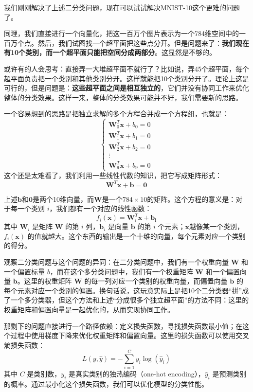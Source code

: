 我们刚刚解决了上述二分类问题，现在可以试试解决MNIST-10这个更难的问题了。

同理，我们直接进行一个向量化，把这一百万个图片表示为一个784维空间中的一百万个点。然后，我们试图找一个超平面把这些点分开。但是问题来了：\textbf{我们现在有10个类别，而一个超平面只能把空间分成两部分}。这显然是不够的。

或许有的人会思考：直接弄一大堆超平面不就行了？比如说，弄45个超平面，每个超平面负责把一个类别和其他类别分开。这样就能把10个类别分开了。理论上这是可行的，但是问题是：\textbf{这些超平面之间是相互独立的}，它们并没有协同工作来优化整体的分类效果。这样一来，整体的分类效果可能并不好，我们需要新的思路。

一个容易想到的思路是把独立求解的多个方程合并成一个方程组，也就是：
\[
    \begin{cases}
        \mathbf{W}_0^T \mathbf{x} + b_0 = 0 \\
        \mathbf{W}_1^T \mathbf{x} + b_1 = 0 \\
        \mathbf{W}_2^T \mathbf{x} + b_2 = 0 \\
        \vdots \\
        \mathbf{W}_9^T \mathbf{x} + b_9 = 0
\end{cases}\]
这个还是太难看了，我们利用一些线性代数的知识，把它写成矩阵形式：
\[ \mathbf{W}^T \mathbf{x} + \mathbf{b} = \mathbf{0} \]

上述$\mathbf{b}$和$\mathbf{0}$是两个10维向量，而$\mathbf{W}$是一个$784 \times 10$的矩阵。这个方程的意义是：对于每一个类别 $i$，我们都有一个对应的线性函数：
\[ f_i(\mathbf{x}) = \mathbf{W}_i^T \mathbf{x + b_i} \]
其中 $\mathbf{W}_i$ 是矩阵 $\mathbf{W}$ 的第 $i$ 列，$\mathbf{b}_i$ 是向量 $\mathbf{b}$ 的第 $i$ 个元素；$\mathbf{x}$越像某一个类别，$f_i(\mathbf{x})$ 的值就越大。这个东西的输出是一个十维的向量，每个元素对应一个类别的得分。

观察二分类问题与这个问题的异同：在二分类问题中，我们有一个权重向量 $\mathbf{W}$ 和一个偏置标量 $b$，而在这个多分类问题中，我们有一个权重矩阵 $\mathbf{W}$ 和一个偏置向量 $\mathbf{b}$。这里的权重矩阵 $\mathbf{W}$ 的每一列对应一个类别的权重向量，而偏置向量 $\mathbf{b}$ 的每个元素对应一个类别的偏置。换句话说，这玩意实际上是把10个二分类器“拼”成了一个多分类器，但这个方法和上述“分成很多个独立超平面”的方法不同：这里的权重矩阵和偏置向量是一起优化的，从而实现协同工作。

那剩下的问题直接进行一个路径依赖：定义损失函数，寻找损失函数最小值；在这个过程中使用梯度下降来优化权重矩阵和偏置向量。这里的损失函数可以使用交叉熵损失函数：
\[ L({y}, \hat{y}) = -\sum_{i=1}^{C} y_i \log(\hat{y}_i) \]
其中 $C$ 是类别数，$y_i$ 是真实类别的独热编码（one-hot encoding），$\hat{y}_i$ 是预测类别的概率。通过最小化这个损失函数，我们可以优化模型的分类性能。

